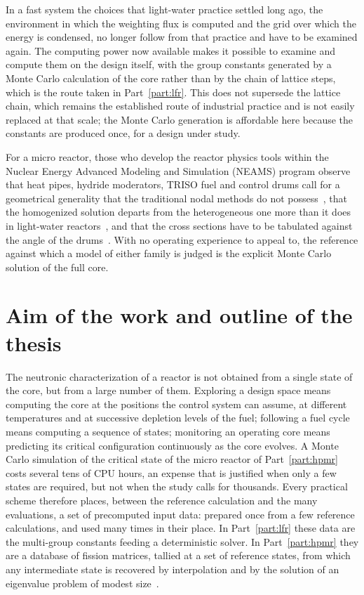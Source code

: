 In a fast system the choices that light-water practice
settled long ago, the environment in which the weighting flux is computed and
the grid over which the energy is condensed, no longer follow from that practice
and have to be examined again. The computing power now available makes it
possible to examine and compute them on the design itself, with the group
constants generated by a Monte Carlo calculation of the core rather than by the
chain of lattice steps, which is the route taken in Part~\ref{part:lfr}. This
does not supersede the lattice chain, which remains the established route of
industrial practice and is not easily replaced at that scale; the Monte Carlo
generation is affordable here because the constants are produced once, for a
design under study.

For a
micro reactor, those who develop the reactor physics tools within the Nuclear
Energy Advanced Modeling and Simulation (NEAMS) program observe that heat
pipes, hydride moderators, TRISO fuel and control drums call
for a geometrical generality that the traditional nodal methods do not
possess~\cite{Wang2025griffin,Stauff2024}, that the homogenized solution departs
from the heterogeneous one more than it does in light-water
reactors~\cite{Pandya2022}, and that the cross sections have to be tabulated
against the angle of the drums~\cite{Roskoff2022physor}. With no operating
experience to appeal to, the reference against which a model of either family is
judged is the explicit Monte Carlo solution of the full core.

\section{Aim of the work and outline of the thesis}

The neutronic characterization of a reactor is not obtained from a single state
of the core, but from a large number of them. Exploring a design space means
computing the core at the positions the control system can assume, at different
temperatures and at successive depletion levels of the fuel; following a fuel cycle means
computing a sequence of states; monitoring an operating core means predicting
its critical configuration continuously as the core evolves. A Monte Carlo simulation of the critical state
of the micro reactor of Part~\ref{part:hpmr} costs several tens of CPU hours, an
expense that is justified when only a few states are required, but not when the
study calls for thousands.
Every practical scheme therefore places, between the reference calculation and
the many evaluations, a set of precomputed input data: prepared once from a few
reference calculations, and used many times in their place. In
Part~\ref{part:lfr} these data are the multi-group constants feeding a
deterministic solver. In Part~\ref{part:hpmr} they are a database of
fission matrices, tallied at a set of reference states, from which any
intermediate state is recovered by interpolation and by the solution of an
eigenvalue problem of modest size~\cite{CarneyANE2014,WaltersNSE2018}.

